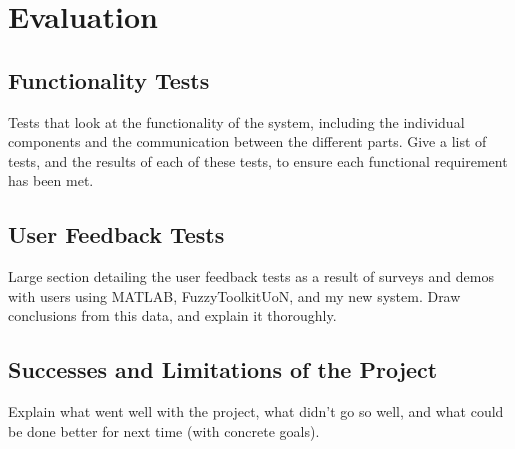 \section{Evaluation}
\subsection{Functionality Tests}
{\color{red} 
Tests that look at the functionality of the system, including the individual components and the communication between the different parts. Give a list of tests, and the results of each of these tests, to ensure each functional requirement has been met.
}

\subsection{User Feedback Tests}
{\color{red}
Large section detailing the user feedback tests as a result of surveys and demos with users using MATLAB, FuzzyToolkitUoN, and my new system. Draw conclusions from this data, and explain it thoroughly.
}


\subsection{Successes and Limitations of the Project}
{\color{red} 
Explain what went well with the project, what didn't go so well, and what could be done better for next time (with concrete goals).
}